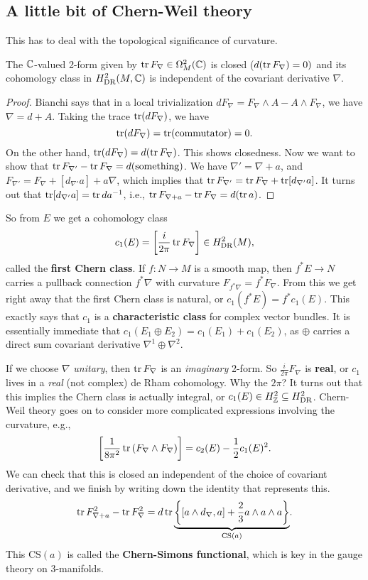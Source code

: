 \subsection{A little bit of Chern-Weil theory}
This has to deal with the topological significance of curvature.
\begin{lemma}
    The $\mathbb{C}$-valued 2-form given by $\operatorname{tr} F_{\nabla}\in \Omega^2_M(\mathbb{C})$ is closed ($d(\operatorname{tr} F_{\nabla})=0)$ and its cohomology class in $H^2_{\mathrm{DR}}(M,\mathbb{C})$ is independent of the covariant derivative $\nabla$.
\end{lemma}
\begin{proof}
    Bianchi says that in a local trivialization $d F_{\nabla}=F_{\nabla} \wedge A - A \wedge F_{\nabla}$, we have $\nabla=d+A$. Taking the trace $\operatorname{tr}(d F_{\nabla})$, we have \[
        \operatorname{tr}(dF_{\nabla})= \operatorname{tr}( \text{commutator} )=0.
    \] On the other hand, $\operatorname{tr}(dF_{\nabla})=d(\operatorname{tr} F_{\nabla})$. This shows closedness. Now we want to show that $\operatorname{tr} F_{\nabla'}-\operatorname{tr} F_{\nabla}=d(\text{something} )$. We have $\nabla'= \nabla +a$, and $F_{\nabla'}= F_{\nabla}+[d _{\nabla'}a] + a \nabla$, which implies that $\operatorname{tr} F_{\nabla'}= \operatorname{tr} F_{\nabla}+ \operatorname{tr} [d_{\nabla'}a]$. It turns out that $\operatorname{tr}[d_{\nabla'}a]= \operatorname{tr} da^{-1}$, i.e., $\operatorname{tr} F_{\nabla+a}-\operatorname{tr} F_{\nabla}= d(\operatorname{tr} a)$.
\end{proof}

So from $E$ we get a cohomology class \[
    c_1(E) = \left[ \frac{i}{2\pi}\operatorname{tr} F_{\nabla} \right] \in H^2_{\mathrm{DR}}(M),
\] called the \textbf{first Chern class}. If $f \colon N \to M$ is a smooth map, then $f ^* E \to N$ carries a pullback connection $f^* \nabla$ with curvature $F_{f ^* \nabla}= f^* F_{\nabla}$. From this we get right away that the first Chern class is natural, or $c_1(f^*E) = f^* c_1(E)$. This exactly says that $c_1$ is a \textbf{characteristic class} for complex vector bundles. It is essentially immediate that $c_1(E_1\oplus E_2) = c_1(E_1)+c_1(E_2)$, as $\oplus$ carries a direct sum covariant derivative $\nabla^1 \oplus \nabla^2$. 

If we choose $\nabla$ \emph{unitary}, then $\operatorname{tr} F_{\nabla}$ is an \emph{imaginary} 2-form. So $\frac{i}{2 \pi}F_{\nabla}$ is \textbf{real}, or $c_1$ lives in a \emph{real} (not complex) de Rham cohomology. Why the $2\pi$? It turns out that this implies the Chern class is actually integral, or $c_1(E) \in H^2_{\mathbb{Z}}\subseteq H^2_{\mathrm{DR}}$. Chern-Weil theory goes on to consider more complicated expressions involving the curvature, e.g., \[
    \left[\frac{1}{8\pi^2}\operatorname{tr} \left(F_{\nabla}\wedge F_{\nabla}\right)\right] = c_2(E) - \frac{1}{2}c_1(E)^2.
\] We can check that this is closed an independent of the choice of covariant derivative, and we finish by writing down the identity that represents this. \[
\operatorname{tr} F_{\nabla+a}^2 - \operatorname{tr} F^2_{\nabla}= d \operatorname{tr} \underset{\mathrm{CS}(a)}{\underbrace{\left\{ [a \wedge d_{\nabla},a]+ \frac{2}{3}a \wedge a \wedge a \right\} }} .
\] This $\mathrm{CS}(a)$ is called the \textbf{Chern-Simons functional}, which is key in the gauge theory on 3-manifolds.
